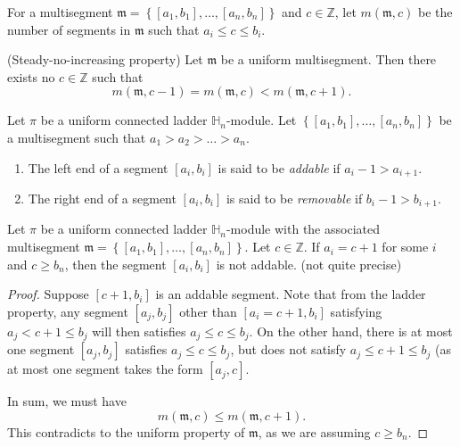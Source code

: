 \begin{definition}
For a multisegment $\mathfrak m=\left\{[a_1,b_1],\ldots, [a_n,b_n]\right\}$ and $c \in \mathbb Z$, let $m(\mathfrak m, c)$ be the number of segments in $\mathfrak m$ such that $a_i\leq c \leq b_i$.
\end{definition}


\begin{lemma} (Steady-no-increasing property) \label{lem steady no inc}
Let $\mathfrak m$ be a uniform multisegment. Then there exists no $c \in \mathbb Z$ such that
\[  m(\mathfrak m, c-1) = m(\mathfrak m, c) < m(\mathfrak m, c+1) .
\]
\end{lemma}




\begin{definition} \label{def uniform ladder add remove}
Let $\pi$ be a uniform connected ladder $\mathbb H_n$-module. Let $\left\{ [a_1,b_1], \ldots, [a_n,b_n]\right\}$ be a multisegment such that $a_1 >a_2>\ldots >a_n$. 
\begin{enumerate}
\item The left end of a segment $[a_i, b_i]$ is said to be {\it addable} if $a_i-1>a_{i+1}$.
\item The right end of a segment $[a_i, b_i]$ is said to be {\it removable} if $b_i-1>b_{i+1}$. 
\end{enumerate}
\end{definition}



\begin{lemma}
Let $\pi$ be a uniform connected ladder $\mathbb H_n$-module with the associated multisegment $\mathfrak m=\left\{  [a_1,b_1], \ldots, [a_n, b_n]\right\}$. Let $c \in \mathbb Z$. If $a_i=c+1$ for some $i$ and $c \geq b_n$, then the segment $[a_i,b_i]$ is not addable. (not quite precise)
\end{lemma}

\begin{proof} 
Suppose $[c+1, b_i]$ is an addable segment. Note that from the ladder property, any segment $[a_j, b_j]$ other than $[a_i=c+1, b_i]$  satisfying $a_j< c+1\leq b_j$ will then satisfies $a_j\leq c \leq b_j$. On the other hand, there is at most one segment $[a_j,b_j]$ satisfies $a_j \leq c \leq b_j$, but does not satisfy $a_j\leq c+1 \leq b_j$ (as at most one segment takes the form $[a_j,c]$. 

In sum, we must have 
\[  m(\mathfrak m, c) \leq m(\mathfrak m,c+1) .
\]
This contradicts to the uniform property of $\mathfrak m$, as we are assuming $c\geq b_n$.
\end{proof} 



